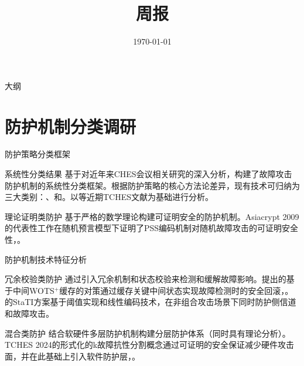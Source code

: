 \documentclass{beamer}
\title{\LARGE{周报}}
\subtitle{}
\author{}
\date{\today}
\begin{document}
\begin{frame}
  \titlepage
\end{frame}

\begin{frame}{大纲}
  \tableofcontents
\end{frame}

\section{防护机制分类调研}
\begin{frame}{防护策略分类框架}
  \begin{block}{系统性分类结果}
    基于对近年来CHES会议相关研究的深入分析，构建了故障攻击防护机制的系统性分类框架。根据防护策略的核心方法论差异，现有技术可归纳为三大类别：、和。以\cite{TCHES:Genet23,TCHES:DhoOvcTop24,TCHES:THNABC24}等近期TCHES文献为基础进行分析。
  \end{block}
  
 \begin{block}{理论证明类防护}
    基于严格的数学理论构建可证明安全的防护机制。Asiacrypt 2009的代表性工作\cite{AC:CorMan09}在随机预言模型下证明了PSS编码机制对随机故障攻击的可证明安全性，。
  \end{block}

\end{frame}

\begin{frame}{防护机制技术特征分析}
  \begin{block}{冗余校验类防护}
    通过引入冗余机制和状态校验来检测和缓解故障影响。\cite{TCHES:Genet23}提出的基于中间WOTS$^{+}$缓存的对策通过缓存关键中间状态实现故障检测时的安全回滚，。\cite{TCHES:DhoOvcTop24}的StaTI方案基于阈值实现和线性编码技术，在非组合攻击场景下同时防护侧信道和故障攻击。
  \end{block}
  
  \begin{block}{混合类防护}
    结合软硬件多层防护机制构建分层防护体系（同时具有理论分析）。TCHES 2024的\cite{TCHES:THNABC24}形式化的k故障抗性分割概念通过可证明的安全保证减少硬件攻击面，并在此基础上引入软件防护层，。
  \end{block}
\end{frame}
\end{document}
